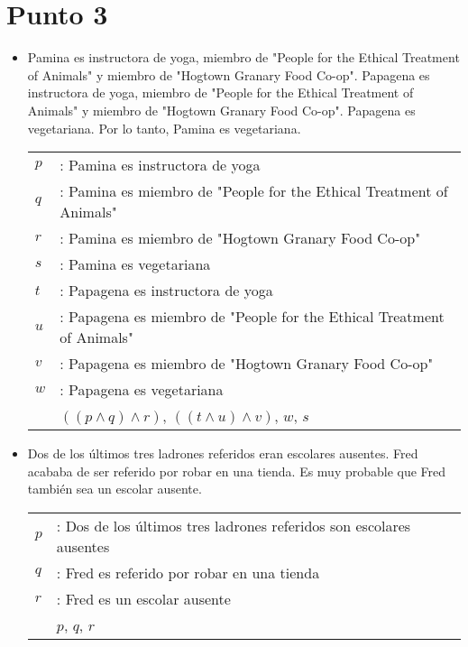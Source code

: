 \documentclass{article}
\begin{document}
\section{Punto 3}
\begin{itemize}
	\item Pamina es instructora de yoga, miembro de "People for the Ethical Treatment of Animals" y miembro de "Hogtown Granary Food Co-op". Papagena es instructora de yoga, miembro de "People for the Ethical Treatment of Animals" y miembro de "Hogtown Granary Food Co-op". Papagena es vegetariana. Por lo tanto, Pamina es vegetariana.
	      \begin{center}
		      \begin{NiceTabular}{l l}
			      $p$ & : Pamina es instructora de yoga                                        \\
			      $q$ & : Pamina es miembro de "People for the Ethical Treatment of Animals"   \\
			      $r$ & : Pamina es miembro de "Hogtown Granary Food Co-op"                    \\
			      $s$ & : Pamina es vegetariana                                                \\
			      $t$ & : Papagena es instructora de yoga                                      \\
			      $u$ & : Papagena es miembro de "People for the Ethical Treatment of Animals" \\
			      $v$ & : Papagena es miembro de "Hogtown Granary Food Co-op"                  \\
			      $w$ & : Papagena es vegetariana                                              \\
			      \hline
			          & $((p \wedge q) \wedge r)$, $((t \wedge u) \wedge v)$, $w$, $s$
		      \end{NiceTabular}
	      \end{center}
	\item Dos de los últimos tres ladrones referidos eran escolares ausentes. Fred acababa de ser referido por robar en una tienda. Es muy probable que Fred también sea un escolar ausente.
	      \begin{center}
		      \begin{NiceTabular}{l l}
			      $p$ & : Dos de los últimos tres ladrones referidos son escolares ausentes \\
			      $q$ & : Fred es referido por robar en una tienda                          \\
			      $r$ & : Fred es un escolar ausente                                        \\
			      \hline
			          & $p$, $q$, $r$
		      \end{NiceTabular}
	      \end{center}
\end{itemize}
\clearpage
\end{document}
